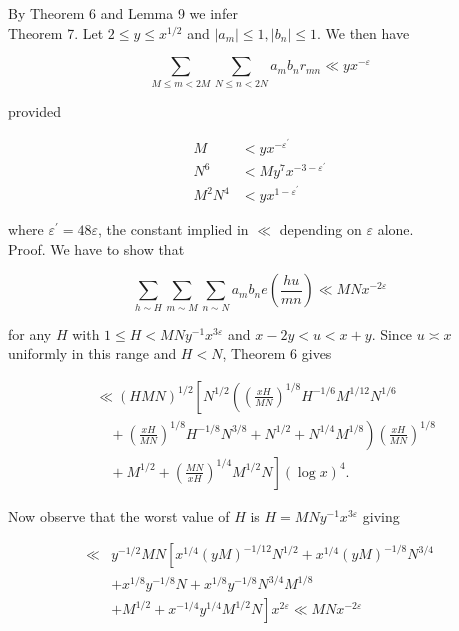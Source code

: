 \documentclass[10pt]{article}
\begin{document}
By Theorem 6 and Lemma 9 we infer\\
Theorem 7. Let $2 \leqslant y \leqslant x^{1 / 2}$ and $\left|a_{m}\right| \leqslant 1,\left|b_{n}\right| \leqslant 1$. We then have


\begin{equation*}
\sum_{M \leqslant m<2 M} \sum_{N \leqslant n<2 N} a_mb_nr_{mn}\ll yx^{-\varepsilon} \tag{7.3}
\end{equation*}


provided


\begin{align*}
M & <y x^{-\varepsilon^{\prime}}  \tag{7.4}\\
N^{6} & <M y^{7} x^{-3-\varepsilon^{\prime}}  \tag{7.5}\\
M^{2} N^{4} & <y x^{1-\varepsilon^{\prime}} \tag{7.6}
\end{align*}


where $\varepsilon^{\prime}=48 \varepsilon$, the constant implied in $\ll$ depending on $\varepsilon$ alone.\\
Proof. We have to show that

$$
\sum_{h\sim H}\sum_{m\sim M}\sum_{n\sim N}a_mb_n
 e\left(\frac{hu}{mn}\right)\ll MNx^{-2\varepsilon}
$$

for any $H$ with $1 \leqslant H<M N y^{-1} x^{3 \varepsilon}$ and $x-2y<u<x+y$. Since $u\asymp x$ uniformly in this range and $H<N$, Theorem 6 gives

$$
\begin{aligned}
& \ll(HMN)^{1/2}\left[N ^ { 1 / 2 } \left(\left(\frac{x H}{M N}\right)^{1 / 8} H^{-1 / 6} M^{1 / 12} N^{1 / 6}\right.\right. \\
& \left.\quad+\left(\frac{x H}{M N}\right)^{1 / 8} H^{-1 / 8} N^{3 / 8}+N^{1 / 2}+N^{1 / 4} M^{1 / 8}\right)\left(\frac{x H}{M N}\right)^{1 / 8} \\
& \left.\quad+M^{1 / 2}+\left(\frac{M N}{x H}\right)^{1 / 4} M^{1 / 2} N\right](\log x)^{4} .
\end{aligned}
$$

Now observe that the worst value of $H$ is $H=M N y^{-1} x^{3 \varepsilon}$ giving

$$
\begin{aligned}
\ll{}&y^{-1/2}MN\left[x^{1 / 4}(y M)^{-1 / 12} N^{1 / 2}+x^{1 / 4}(y M)^{-1 / 8} N^{3 / 4}\right. \\
& +x^{1 / 8} y^{-1 / 8} N+x^{1 / 8} y^{-1 / 8} N^{3 / 4} M^{1 / 8} \\
& \left.+M^{1 / 2}+x^{-1 / 4} y^{1 / 4} M^{1 / 2} N\right] x^{2 \varepsilon} \ll M N x^{-2 \varepsilon}
\end{aligned}
$$
\end{document}
